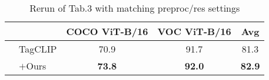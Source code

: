 \begin{table}[ht]
\centering
\begin{tabular}{llcc|c}
\toprule
    &             &       COCO ViT-B/16 &       VOC ViT-B/16 &            Avg \\
\midrule
 & TagCLIP &           70.9 &           91.7 &           81.3 \\
    & $+$Ours &           \textbf{73.8} &           \textbf{92.0} &  \textbf{82.9} \\
\bottomrule
\end{tabular}
\vspace{-2pt}
\caption{Rerun of Tab.3 with matching preproc/res settings}
\label{tab:CompetitionTagCLIPlogYESrowcalibbaseNOCustomResolution}
\end{table}
